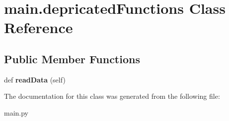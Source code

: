 \hypertarget{classmain_1_1depricated_functions}{}\section{main.\+depricated\+Functions Class Reference}
\label{classmain_1_1depricated_functions}
\subsection*{Public Member Functions}
\begin{DoxyCompactItemize}
\item 
def {\bfseries read\+Data} (self)\hypertarget{classmain_1_1depricated_functions_a2199d55c8b89dfb27c478823bf4ce536}{}\label{classmain_1_1depricated_functions_a2199d55c8b89dfb27c478823bf4ce536}

\end{DoxyCompactItemize}


The documentation for this class was generated from the following file\+:\begin{DoxyCompactItemize}
\item 
main.\+py\end{DoxyCompactItemize}
